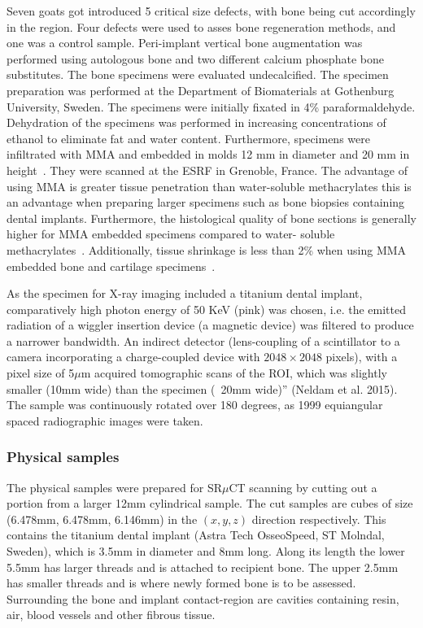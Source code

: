 Seven goats got introduced 5 critical size defects, with bone being cut accordingly in the region.
 Four defects were used to asses bone regeneration methods, and one was a control sample.
 Peri-implant vertical bone augmentation was performed using autologous bone and two different
 calcium phosphate bone substitutes. The bone specimens were evaluated undecalcified. The
 specimen preparation was performed at the Department of Biomaterials at Gothenburg University,
 Sweden. The specimens were initially fixated in 4\% paraformaldehyde. Dehydration of the
 specimens was performed in increasing concentrations of ethanol to eliminate fat and water
 content. Furthermore, specimens were infiltrated with MMA and embedded in molds 12 mm in
 diameter and 20 mm in height~\cite{donath1982,donath1993,erben1997}. They were scanned at the ESRF
 in Grenoble, France. The advantage of using MMA is greater tissue penetration than water-soluble
 methacrylates this is an advantage when preparing larger specimens such as bone biopsies
 containing dental implants. Furthermore, the histological quality of bone sections is generally
 higher for MMA embedded specimens compared to water- soluble methacrylates~\cite{erben1997}.
 Additionally, tissue shrinkage is less than 2\% when using MMA embedded bone and cartilage
 specimens~\cite{ferguson1999}.


As the specimen for X-ray imaging included a titanium dental implant, comparatively high photon
 energy of 50 KeV (pink) was chosen, i.e. the
 emitted radiation of a wiggler insertion device (a
 magnetic device) was filtered    to produce a narrower bandwidth. An indirect detector (lens-coupling
 of a scintillator to a camera incorporating a charge-coupled device with $2048 \times 2048$ pixels),
 with a pixel size of 5$\mu$m acquired tomographic scans of the ROI, which was slightly smaller (10mm wide)
 than the specimen (~20mm wide)” (Neldam et al. 2015). The sample was continuously rotated over
 180 degrees, as 1999 equiangular spaced radiographic images were taken.

\subsubsection{Physical samples}

The physical samples were prepared for SR$\mu$CT scanning by cutting out a portion from a larger
12mm cylindrical sample. The cut samples are cubes of size (6.478mm, 6.478mm, 6.146mm) in the
$(x,y,z)$ direction respectively. This contains the titanium dental implant (Astra Tech OsseoSpeed,
ST Molndal, Sweden), which is 3.5mm in diameter and 8mm long. Along its length the lower 5.5mm
has larger threads and is attached to recipient bone. The upper 2.5mm has smaller threads and
is where newly formed bone is to be assessed. Surrounding the bone and implant contact-region
are cavities containing resin, air, blood vessels and other fibrous tissue.

